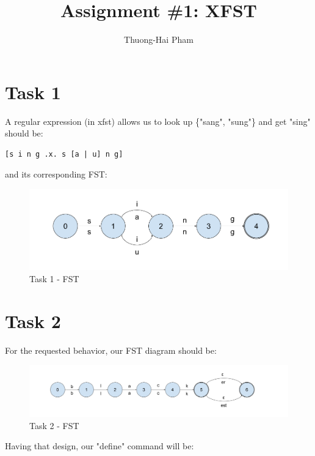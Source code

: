 \documentclass[]{article}
\title{Assignment \#1: XFST}
\author{Thuong-Hai Pham}
\begin{document}
\maketitle

\begin{abstract}

\end{abstract}

\section{Task 1}
A regular expression (in xfst) allows us to look up \{"sang", "sung"\} and get "sing" should be:

\begin{lstlisting}
[s i n g .x. s [a | u] n g]
\end{lstlisting}

and its corresponding FST:

\begin{figure}[h]
	\centering
	\includegraphics[scale=0.4]{xfst-task1}
	\caption{Task 1 - FST}
	\label{fig:xfst-task1}
\end{figure}

\section{Task 2}

For the requested behavior, our FST diagram should be:

\begin{figure}[H]
	\centering
	\includegraphics[scale=0.27]{xfst-task2}
	\caption{Task 2 - FST}
	\label{fig:xfst-task2}
\end{figure}


Having that design, our "define" command will be:
\end{document}
